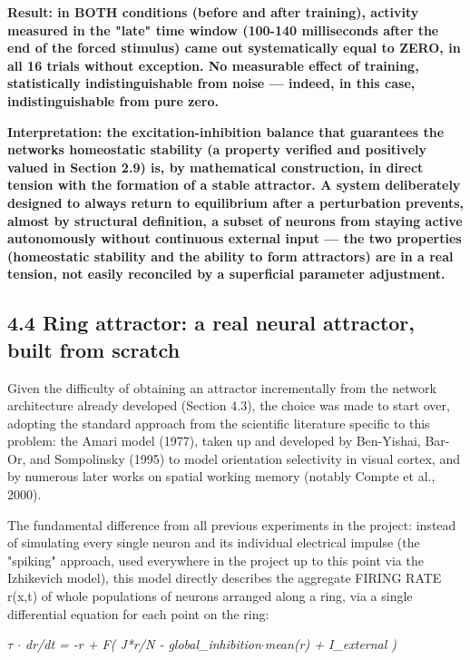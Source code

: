 \documentclass[
  english,
]{article}
\begin{document}
\textbf{Result: in BOTH conditions (before and after training), activity measured in the "late" time window (100-140 milliseconds after the end of the forced stimulus) came out systematically equal to ZERO, in all 16 trials without exception. No measurable effect of training, statistically indistinguishable from noise --- indeed, in this case, indistinguishable from pure zero.}

\textbf{Interpretation: the excitation-inhibition balance that guarantees the network\textquotesingle s homeostatic stability (a property verified and positively valued in Section 2.9) is, by mathematical construction, in direct tension with the formation of a stable attractor. A system deliberately designed to always return to equilibrium after a perturbation prevents, almost by structural definition, a subset of neurons from staying active autonomously without continuous external input --- the two properties (homeostatic stability and the ability to form attractors) are in a real tension, not easily reconciled by a superficial parameter adjustment.}

\subsection{4.4 Ring attractor: a real neural attractor, built from scratch}\label{ring-attractor-a-real-neural-attractor-built-from-scratch}

Given the difficulty of obtaining an attractor incrementally from the network architecture already developed (Section 4.3), the choice was made to start over, adopting the standard approach from the scientific literature specific to this problem: the Amari model (1977), taken up and developed by Ben-Yishai, Bar-Or, and Sompolinsky (1995) to model orientation selectivity in visual cortex, and by numerous later works on spatial working memory (notably Compte et al., 2000).

The fundamental difference from all previous experiments in the project: instead of simulating every single neuron and its individual electrical impulse (the "spiking" approach, used everywhere in the project up to this point via the Izhikevich model), this model directly describes the aggregate FIRING RATE r(x,t) of whole populations of neurons arranged along a ring, via a single differential equation for each point on the ring:

\emph{$\tau$ $\cdot$ dr/dt = -r + F( J*r/N - global\_\allowbreak{}inhibition$\cdot$mean(r) + I\_\allowbreak{}external )}
\end{document}
